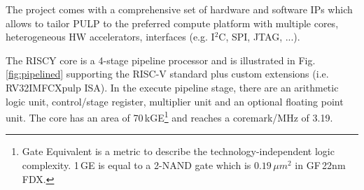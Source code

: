 The project comes with a comprehensive set of hardware and software IPs which allows to tailor PULP to the preferred compute platform with multiple cores, heterogeneous HW accelerators, interfaces (e.g. I$^{2}$C, SPI, JTAG, ...).

The RISCY core is a 4-stage pipeline processor and is illustrated in Fig.\,\ref{fig:pipelined} supporting the RISC-V standard plus custom extensions (i.e. RV32IMFCXpulp ISA). In the execute pipeline stage, there are an arithmetic logic unit, control/stage register, multiplier unit and an optional floating point unit. The core has an area of 70\,kGE\footnote{Gate Equivalent is a metric to describe the technology-independent logic complexity. 1\,GE is equal to a 2-NAND gate which is $0.19\,\mu m^2$ in GF\,22nm FDX.} and reaches a coremark/MHz of 3.19.

